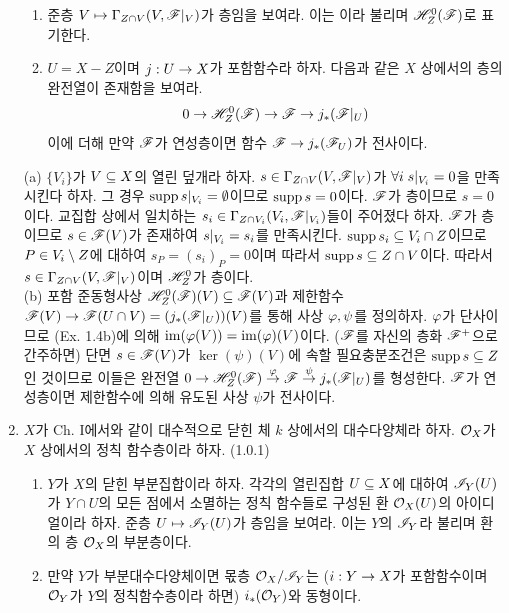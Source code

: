 \begin{enumerate}[label=\tb{1.\arabic*.},itemindent=0mm,itemsep=4mm]
\begin{enumerate}[label=(\alph*)]
	\item 준층 $V\mapsto\Gamma_{Z\cap V}(V,\mathscr{F}|_V)$가 층임을 보여라.
	이는 이라 불리며 $\mathscr{H}_Z^0(\mathscr{F})$로 표기한다.
	\item $U=X-Z$이며 $j:U\rightarrow X$가 포함함수라 하자. 다음과 같은 $X$ 상에서의 층의 완전열이 존재함을 보여라.
	$$0\rightarrow\mathscr{H}_Z^0(\mathscr{F})\rightarrow\mathscr{F}\rightarrow j_*(\mathscr{F}|_U)$$
	이에 더해 만약 $\mathscr{F}$가 연성층이면 함수 $\mathscr{F}\rightarrow j_*(\mathscr{F}_U)$가 전사이다.
	\end{enumerate}
	\sol (a) $\{V_i\}$가 $V\subseteq X$의 열린 덮개라 하자. $s\in\Gamma_{Z\cap V}(V,\mathscr{F}|_V)$가
	$\forall i\;s|_{V_i}=0$을 만족시킨다 하자. 그 경우 $\operatorname{supp} s|_{V_i}=\emptyset$이므로 $\operatorname{supp} s=0$이다.
	$\mathscr{F}$가 층이므로 $s=0$이다.
	교집합 상에서 일치하는 $s_i\in\Gamma_{Z\cap V_i}(V_i,\mathscr{F}|_{V_i})$들이 주어졌다 하자.
	$\mathscr{F}$가 층이므로 $s\in\mathscr{F}(V)$가 존재하여 $s|_{V_i}=s_i$를 만족시킨다.
	$\operatorname{supp} s_i\subseteq V_i\cap Z$이므로 $P\in V_i\setminus Z$에 대하여 $s_P=(s_i)_P=0$이며 따라서 $\operatorname{supp} s\subseteq Z\cap V$이다.
	따라서 $s\in\Gamma_{Z\cap V}(V,\mathscr{F}|_V)$이며 $\mathscr{H}^0_Z$가 층이다.\\
	(b) 포함 준동형사상 $\mathscr{H}^0_Z(\mathscr{F})(V)\subseteq\mathscr{F}(V)$과
	제한함수 $\mathscr{F}(V)\rightarrow\mathscr{F}(U\cap V)=(j_*(\mathscr{F}|_U))(V)$를 통해 사상 $\varphi,\psi$를 정의하자.
	$\varphi$가 단사이므로 (Ex. 1.4b)에 의해 $\operatorname{im}(\varphi(V))=\operatorname{im}(\varphi)(V)$이다.
	($\mathscr{F}$를 자신의 층화 $\mathscr{F}^+$으로 간주하면) 단면 $s\in\mathscr{F}(V)$가 $\ker(\psi)(V)$에 속할 필요충분조건은
	$\operatorname{supp} s\subseteq Z$인 것이므로 이들은 완전열 $0\rightarrow\mathscr{H}^0_Z(\mathscr{F})\stackrel{\varphi}{\rightarrow}\mathscr{F}\stackrel{\psi}{\rightarrow} j_*(\mathscr{F}|_U)$를 형성한다.
	$\mathscr{F}$가 연성층이면 제한함수에 의해 유도된 사상 $\psi$가 전사이다.
	\item {}
	$X$가 Ch. I에서와 같이 대수적으로 닫힌 체 $k$ 상에서의 대수다양체라 하자.
	$\mathcal{O}_X$가 $X$ 상에서의 정칙 함수층이라 하자. (1.0.1)
	\begin{enumerate}[label=(\alph*)]
	\item $Y$가 $X$의 닫힌 부분집합이라 하자. 각각의 열린집합 $U\subseteq X$에 대하여 $\mathscr{I}_Y(U)$가 $Y\cap U$의 모든 점에서 소멸하는
	정칙 함수들로 구성된 환 $\mathcal{O}_X(U)$의 아이디얼이라 하자. 준층 $U\mapsto\mathscr{I}_Y(U)$가 층임을 보여라.
	이는 $Y$의  $\mathscr{I}_Y$라 불리며 환의 층 $\mathcal{O}_X$의 부분층이다.
	\item 만약 $Y$가 부분대수다양체이면 몫층 $\mathcal{O}_X/\mathscr{I}_Y$는
	($i:Y\rightarrow X$가 포함함수이며 $\mathcal{O}_Y$가 $Y$의 정칙함수층이라 하면) $i_*(\mathcal{O}_Y)$와 동형이다.

\end{enumerate}
\end{enumerate}
